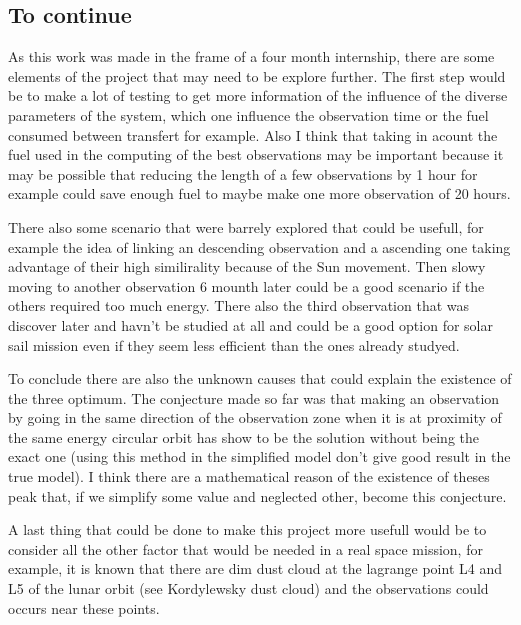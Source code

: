 \documentclass[11pt]{article} %
\begin{document}
			 
			 \subsection{To continue}
			 
			 As this work was made in the frame of a four month internship, there are some elements of the project that may need to be explore further.
			 The first step would be to make a lot of testing to get more information of the influence of the diverse parameters of the system, which one influence the observation time or the fuel consumed between transfert for example. Also I think that taking in acount the fuel used in the computing of the best observations may be important because it may be possible that reducing the length of a few observations by 1 hour for example could save enough fuel to maybe make one more observation of 20 hours.
			 
			 There also some scenario that were barrely explored that could be usefull, for example the idea of linking an descending observation and a ascending one taking advantage of their high similirality because of the Sun movement. Then slowy moving to another observation 6 mounth later could be a good scenario if the others required too much energy. There also the third observation that was discover later and havn't be studied at all and could be a good option for solar sail mission even if they seem less efficient than the ones already studyed.
	
			 To conclude there are also the unknown causes that could explain the existence of the three optimum. The conjecture made so far was that making an observation by going in the same direction of the observation zone when it is at proximity of the same energy circular orbit has show to be the solution without being the exact one (using this method in the simplified model don't give good result in the true model). I think there are a mathematical reason of the existence of theses peak that, if we simplify some value and neglected other, become this conjecture.
			 
			 A last thing that could be done to make this project more usefull would be to consider all the other factor that would be needed in a real space mission, for example, it is known that there are dim dust cloud at the lagrange point L4 and L5 of the lunar orbit (see Kordylewsky dust cloud) and the observations could occurs near these points. 
		
\end{document}
